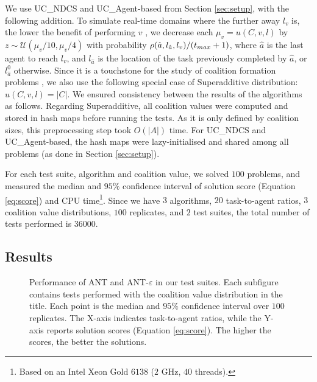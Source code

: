 We use UC\_NDCS and UC\_Agent-based from Section \ref{sec:setup}, with the following
addition. To simulate real-time domains where the further away $l_v$ is, the lower the
benefit of performing $v$ \cite{stankovic2013edf}, we decrease each $\mu_v = u(C, v, l)$
by $z \sim \mathcal{U}(\mu_v / 10, \mu_v / 4)$ with probability $\rho(\hat{a},
l_{\hat{a}}, l_v) / (t_{max} + 1)$, where $\hat{a}$ is the last agent to reach $l_v$, and
$l_{\hat{a}}$ is the location of the task previously completed by $\hat{a}$, or
$l_{\hat{a}}^0$ otherwise. Since it is a touchstone for the study of coalition formation
problems \cite{sandholm1999}, we also use the following special case of Superadditive
distribution: $u(C, v, l) = |C|$.
We ensured consistency between the results of the algorithms as follows. Regarding
Superadditive, all coalition values were computed and stored in hash maps before running
the tests. As it is only defined by coalition sizes, this preprocessing step took $O(|A|)$
time. For UC\_NDCS and UC\_Agent-based, the hash maps were lazy-initialised and shared
among all problems (as done in Section \ref{sec:setup}).

For each test suite, algorithm and coalition value, we solved $100$ problems, and measured
the median and $95\%$ confidence interval of solution score (Equation \ref{eq:score}) and
CPU time\footnote{Based on an Intel Xeon Gold $6138$ ($2$ GHz, $40$ threads).}. Since we
have $3$ algorithms, $20$ task-to-agent ratios, $3$ coalition value distributions, $100$
replicates, and $2$ test suites, the total number of tests performed is $36000$.

\subsection{Results}

\begin{figure}[t]
    \centering
    \begin{adjustbox}{width=\textwidth}
        
    \end{adjustbox}
    \begin{adjustbox}{width=\textwidth}
        
    \end{adjustbox}
    \caption[Evaluation of ANT and ANT-$\varepsilon$]{%
        Performance of ANT and ANT-$\varepsilon$ in our test suites. Each subfigure
        contains tests performed with the coalition value distribution in the title. Each
        point is the median and $95\%$ confidence interval over $100$ replicates. The
        X-axis indicates task-to-agent ratios, while the Y-axis reports solution scores
        (Equation \ref{eq:score}). The higher the scores, the better the solutions.}
    \label{fig:mt}
\end{figure}

